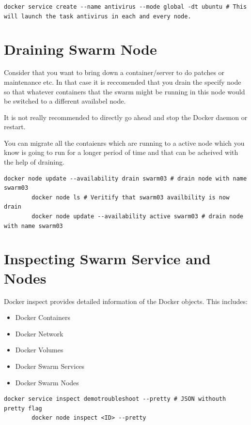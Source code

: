 \documentclass[11pt]{book}
\begin{document}
    \begin{lstlisting}[style=terminal]
        docker service create --name antivirus --mode global -dt ubuntu # This will launch the task antivirus in each and every node.
    \end{lstlisting}

    \section{Draining Swarm Node}
    Consider that you want to bring down a container/server to do patches or maintenance etc.
    In that case it is reccomended that you drain the specify node so that whatever containers that the swarm might be running in this node would be switched to a different availabel node.

    It is not really recommended to directly go ahead and stop the Docker daemon or restart.

    You can migrate all the contaienrs which are running to a active node which you know is going to run for a longer period of time and that can be acheived with the help of draining.

    \begin{lstlisting}[style=terminal]
        docker node update --availability drain swarm03 # drain node with name swarm03
        docker node ls # Veritify that swarm03 availbility is now drain
        docker node update --availability active swarm03 # drain node with name swarm03
    \end{lstlisting}

    \section{Inspecting Swarm Service and Nodes}
    Docker inspect provides detailed information of the Docker objects.
    This includes:
    \begin{itemize}
        \item Docker Containers
        \item Docker Network
        \item Docker Volumes
        \item Docker Swarm Services
        \item Docker Swarm Nodes
    \end{itemize}

    \begin{lstlisting}[style=terminal]
        docker service inspect demotroubleshoot --pretty # JSON withouth pretty flag
        docker node inspect <ID> --pretty
    \end{lstlisting}
    
\end{document}
